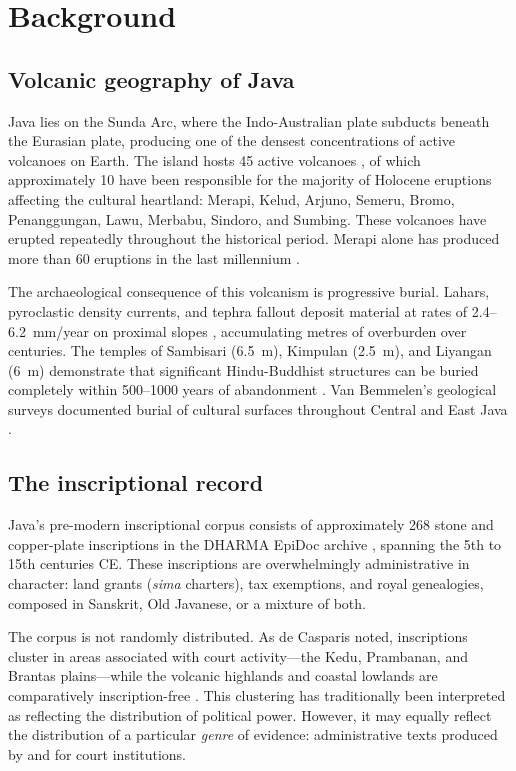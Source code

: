 \documentclass[12pt]{article}
\begin{document}
\section{Background}

\subsection{Volcanic geography of Java}

Java lies on the Sunda Arc, where the Indo-Australian plate subducts beneath the Eurasian plate, producing one of the densest concentrations of active volcanoes on Earth.
The island hosts 45 active volcanoes \citep{GVP2024}, of which approximately 10 have been responsible for the majority of Holocene eruptions affecting the cultural heartland: Merapi, Kelud, Arjuno, Semeru, Bromo, Penanggungan, Lawu, Merbabu, Sindoro, and Sumbing.
These volcanoes have erupted repeatedly throughout the historical period.
Merapi alone has produced more than 60 eruptions in the last millennium \citep{Newhall2000, Gertisser2012}.

The archaeological consequence of this volcanism is progressive burial.
Lahars, pyroclastic density currents, and tephra fallout deposit material at rates of 2.4--6.2~mm/year on proximal slopes \citep{Lavigne2000}, accumulating metres of overburden over centuries.
The temples of Sambisari (6.5~m), Kimpulan (2.5~m), and Liyangan (6~m) demonstrate that significant Hindu-Buddhist structures can be buried completely within 500--1000 years of abandonment \citep{Putra2019, Abbas2016}.
Van Bemmelen's geological surveys documented burial of cultural surfaces throughout Central and East Java \citep{VanBemmelen1949}.

\subsection{The inscriptional record}

Java's pre-modern inscriptional corpus consists of approximately 268 stone and copper-plate inscriptions in the DHARMA EpiDoc archive \citep{DHARMA2024}, spanning the 5th to 15th centuries CE.
These inscriptions are overwhelmingly administrative in character: land grants (\textit{sima} charters), tax exemptions, and royal genealogies, composed in Sanskrit, Old Javanese, or a mixture of both.

The corpus is not randomly distributed.
As de Casparis noted, inscriptions cluster in areas associated with court activity---the Kedu, Prambanan, and Brantas plains---while the volcanic highlands and coastal lowlands are comparatively inscription-free \citep{Casparis1975}.
This clustering has traditionally been interpreted as reflecting the distribution of political power.
However, it may equally reflect the distribution of a particular \emph{genre} of evidence: administrative texts produced by and for court institutions.
\end{document}
